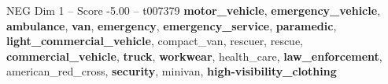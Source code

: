\begin{textsample}{NEG Dim 1 – Score -5.00 – t007379}  \label{ex:f1_neg_008}
\textbf{motor\_vehicle}, \textbf{emergency\_vehicle}, \textbf{ambulance}, \textbf{van}, \textbf{emergency}, \textbf{emergency\_service}, \textbf{paramedic}, \textbf{light\_commercial\_vehicle}, compact\_van, rescuer, rescue, \textbf{commercial\_vehicle}, \textbf{truck}, \textbf{workwear}, health\_care, \textbf{law\_enforcement}, american\_red\_cross, \textbf{security}, minivan, \textbf{high-visibility\_clothing}

\end{textsample}
